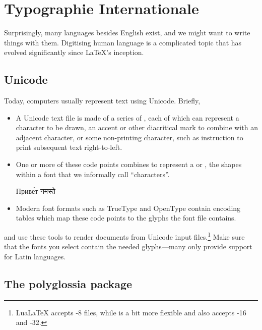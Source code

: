 \chapter{Typographie Internationale}

Surprisingly, many languages besides English exist,
and we might want to write things with them.
Digitising human language is a complicated topic that has evolved significantly
since \LaTeX's inception.

\section{Unicode}

Today, computers usually represent text using Unicode. Briefly,
\begin{itemize}
\item A Unicode text file is made of a series of ,
    each of which can represent a character to be drawn,
    an accent or other diacritical mark to combine with an adjacent character,
    or some non-printing character,
    such as instruction to print subsequent text right-to-left.
\item One or more of these code points combines to represent a
     or ,
    the shapes within a font that we informally call ``characters''\quotekern.
\begin{centerfigure}
\large%
%
Приве́т
\quad{}%
नमस्ते
\end{centerfigure}
\item Modern font formats such as TrueType and OpenType contain encoding tables
    which map these code points to the glyphs the font file contains.
\end{itemize}
\LuaLaTeX{} and \XeLaTeX{} use these tools to render documents
from Unicode input
files.\punckern\footnote{LuaLaTeX accepts \mbox{-8} files,
while \XeLaTeX is a bit more flexible and also
accepts \mbox{-16} and
\mbox{-32}.}
Make sure that the fonts you select contain the needed glyphs---many
only provide support for Latin languages.

\section{The polyglossia package}

